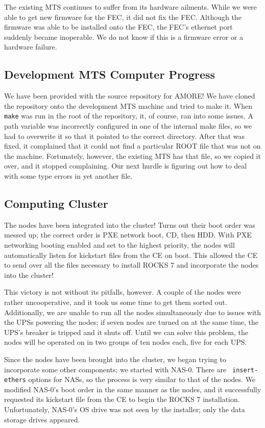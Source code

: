 \documentclass[12pt]{article}
\newcommand\tab[1][1cm]{\hspace*{#1}}
\begin{document}
\tab The existing MTS continues to suffer from its hardware ailments. While we
were able to get new firmware for the FEC, it did not fix the FEC. Although the
firmware was able to be installed onto the FEC, the FEC's ethernet port suddenly
became inoperable. We do not know if this is a firmware error or a hardware
failure.

\subsection{Development MTS Computer Progress}

\tab We have been provided with the source repository for AMORE! We have cloned
the repository onto the development MTS machine and tried to make it. When {\tt
  make} was run in the root of the repository, it, of course, ran into some
issues. A path variable was incorrectly configured in one of the internal make
files, so we had to overwrite it so that it pointed to the correct
directory. After that was fixed, it complained that it could not find a
particular ROOT file that was not on the machine. Fortunately, however, the
existing MTS has that file, so we copied it over, and it stopped
complaining. Our next hurdle is figuring out how to deal with some type errors
in yet another file.

\subsection{Computing Cluster}

\tab The nodes have been integrated into the cluster! Turns out their boot order
was messed up; the correct order is PXE network boot, CD, then HDD. With PXE
networking booting enabled and set to the highest priority, the nodes will
automatically listen for kickstart files from the CE on boot. This allowed the
CE to send over all the files necessary to install ROCKS 7 and incorporate the
nodes into the cluster! 

\tab This victory is not without its pitfalls, however. A couple of the nodes
were rather uncooperative, and it took us some time to get them sorted
out. Additionally, we are unable to run all the nodes simultaneously due to
issues with the UPSs powering the nodes; if seven nodes are turned on at the
same time, the UPS's breaker is tripped and it shuts off. Until we can solve
this problem, the nodes will be operated on in two groups of ten nodes each,
five for each UPS.

\tab Since the nodes have been brought into the cluster, we began trying to
incorporate some other components; we started with NAS-0. There are {\tt
  insert-ethers} options for NASs, so the process is very similar to that of the
nodes. We modified NAS-0's boot order in the same manner as the nodes, and it
successfully requested its kickstart file from the CE to begin the ROCKS 7
installation. Unfortunately, NAS-0's OS drive was not seen by the installer;
only the data storage drives appeared. 
\end{document}

